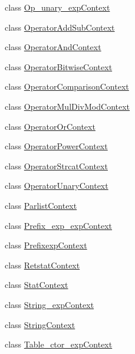 \begin{DoxyCompactItemize}
class \mbox{\hyperlink{classzlua_1_1_lua_parser_1_1_op__unary__exp_context}{Op\+\_\+unary\+\_\+exp\+Context}}
\item 
class \mbox{\hyperlink{classzlua_1_1_lua_parser_1_1_operator_add_sub_context}{Operator\+Add\+Sub\+Context}}
\item 
class \mbox{\hyperlink{classzlua_1_1_lua_parser_1_1_operator_and_context}{Operator\+And\+Context}}
\item 
class \mbox{\hyperlink{classzlua_1_1_lua_parser_1_1_operator_bitwise_context}{Operator\+Bitwise\+Context}}
\item 
class \mbox{\hyperlink{classzlua_1_1_lua_parser_1_1_operator_comparison_context}{Operator\+Comparison\+Context}}
\item 
class \mbox{\hyperlink{classzlua_1_1_lua_parser_1_1_operator_mul_div_mod_context}{Operator\+Mul\+Div\+Mod\+Context}}
\item 
class \mbox{\hyperlink{classzlua_1_1_lua_parser_1_1_operator_or_context}{Operator\+Or\+Context}}
\item 
class \mbox{\hyperlink{classzlua_1_1_lua_parser_1_1_operator_power_context}{Operator\+Power\+Context}}
\item 
class \mbox{\hyperlink{classzlua_1_1_lua_parser_1_1_operator_strcat_context}{Operator\+Strcat\+Context}}
\item 
class \mbox{\hyperlink{classzlua_1_1_lua_parser_1_1_operator_unary_context}{Operator\+Unary\+Context}}
\item 
class \mbox{\hyperlink{classzlua_1_1_lua_parser_1_1_parlist_context}{Parlist\+Context}}
\item 
class \mbox{\hyperlink{classzlua_1_1_lua_parser_1_1_prefix__exp__exp_context}{Prefix\+\_\+exp\+\_\+exp\+Context}}
\item 
class \mbox{\hyperlink{classzlua_1_1_lua_parser_1_1_prefixexp_context}{Prefixexp\+Context}}
\item 
class \mbox{\hyperlink{classzlua_1_1_lua_parser_1_1_retstat_context}{Retstat\+Context}}
\item 
class \mbox{\hyperlink{classzlua_1_1_lua_parser_1_1_stat_context}{Stat\+Context}}
\item 
class \mbox{\hyperlink{classzlua_1_1_lua_parser_1_1_string__exp_context}{String\+\_\+exp\+Context}}
\item 
class \mbox{\hyperlink{classzlua_1_1_lua_parser_1_1_string_context}{String\+Context}}
\item 
class \mbox{\hyperlink{classzlua_1_1_lua_parser_1_1_table__ctor__exp_context}{Table\+\_\+ctor\+\_\+exp\+Context}}

\end{DoxyCompactItemize}
